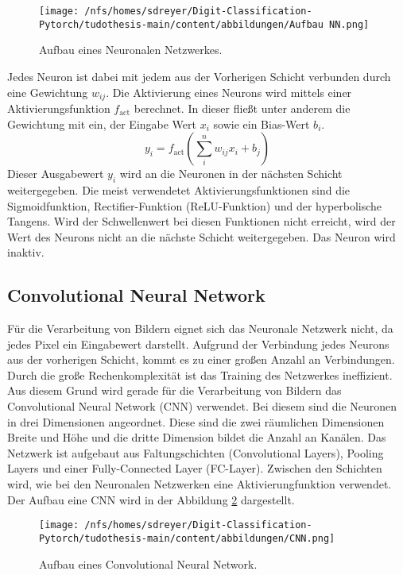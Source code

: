 \begin{figure}[htbp]
  \centering
  \texttt{[image: /nfs/homes/sdreyer/Digit-Classification-Pytorch/tudothesis-main/content/abbildungen/Aufbau NN.png]}
  \caption{Aufbau eines Neuronalen Netzwerkes.~\cite{lecun2015deep}}
  \label{fig:NN}
\end{figure}
Jedes Neuron ist dabei mit jedem aus der Vorherigen Schicht verbunden durch eine Gewichtung $w_{ij}$.
Die Aktivierung eines Neurons wird mittels einer Aktivierungsfunktion $f_\text{act}$ berechnet. In dieser fließt unter anderem die Gewichtung mit 
ein, der Eingabe Wert $x_i$ sowie ein Bias-Wert $b_i$.
\begin{equation}
    y_i = f_\text{act}\left(\sum_{i}^{n} w_{ij}x_i + b_j\right)
\end{equation}
Dieser Ausgabewert $y_i$ wird an die Neuronen in der nächsten Schicht weitergegeben.
Die meist verwendetet Aktivierungsfunktionen sind die Sigmoidfunktion, Rectifier-Funktion (ReLU-Funktion) und der hyperbolische Tangens.
Wird der Schwellenwert bei diesen Funktionen nicht erreicht, wird der Wert des Neurons nicht an die nächste Schicht weitergegeben.
Das Neuron wird inaktiv.~\cite{datascience}

\subsection{Convolutional Neural Network}

Für die Verarbeitung von Bildern eignet sich das Neuronale Netzwerk nicht, da jedes Pixel ein Eingabewert darstellt.
Aufgrund der Verbindung jedes Neurons aus der vorherigen Schicht, kommt es zu einer großen Anzahl an Verbindungen.
Durch die große Rechenkomplexität ist das Training des Netzwerkes ineffizient.
Aus diesem Grund wird gerade für die Verarbeitung von Bildern das Convolutional Neural Network (CNN) verwendet.
Bei diesem sind die Neuronen in drei Dimensionen angeordnet.
Diese sind die zwei räumlichen Dimensionen Breite und Höhe und die dritte Dimension bildet die Anzahl an Kanälen.
Das Netzwerk ist aufgebaut aus Faltungschichten (Convolutional Layers), Pooling Layers und einer Fully-Connected Layer (FC-Layer).
Zwischen den Schichten wird, wie bei den Neuronalen Netzwerken eine Aktivierungfunktion verwendet.~\cite{OShea} 
Der Aufbau eine CNN wird in der Abbildung \ref{fig:CNN} dargestellt.
\begin{figure}[htbp]
  \centering
  \texttt{[image: /nfs/homes/sdreyer/Digit-Classification-Pytorch/tudothesis-main/content/abbildungen/CNN.png]}
  \caption{Aufbau eines Convolutional Neural Network.~\cite{Mohammed2024}}
  \label{fig:CNN}
\end{figure}


